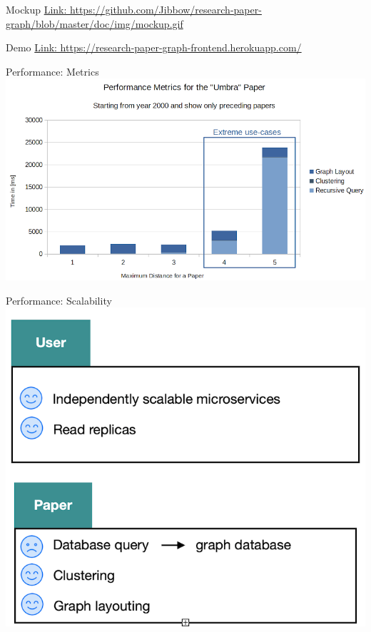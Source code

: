 \documentclass{beamer}
\begin{document}
\begin{frame}{Mockup}
    \url{Link: https://github.com/Jibbow/research-paper-graph/blob/master/doc/img/mockup.gif}
\end{frame}

\begin{frame}{Demo}
    \url{Link: https://research-paper-graph-frontend.herokuapp.com/}
\end{frame}

\begin{frame}{Performance: Metrics}
    \includegraphics{img_25.png}
\end{frame}

\begin{frame}{Performance: Scalability}
    \includegraphics{img_26.png}
\end{frame}
\end{document}
